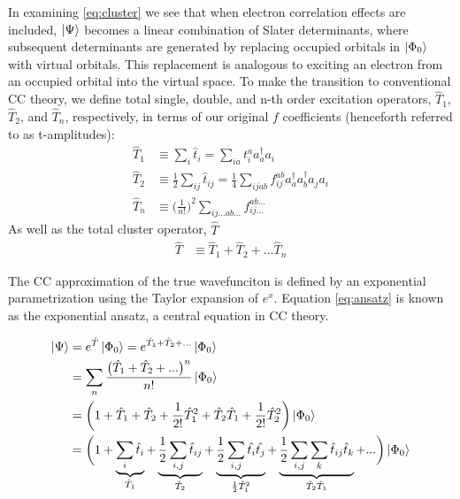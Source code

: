 \documentclass[letterpaper, 12pt]{article}
\newcommand{\adag}{a^{\dagger}} %
\begin{document}
In examining \eqref{eq:cluster} we see that when electron correlation effects are included, $\ket{\Psi}$ becomes a linear combination of Slater determinants, where subsequent determinants are generated by replacing occupied orbitals in $\ket{\Phi_{0}}$ with virtual orbitals. This replacement is analogous to exciting an electron from an occupied orbital into the virtual space. To make the transition to conventional CC theory, we define total single, double, and n-th order excitation operators, $\hat{T}_1$, $\hat{T}_2$, and $\hat{T}_n$, respectively, in terms of our original $f$ coefficients (henceforth referred to as t-amplitudes): \begin{align}
\hat{T}_1 &\equiv \sum_{i}  \hat{t}_i = \sum_{ia}  t^a_i \adag_a a_i\\
\hat{T}_2 &\equiv \frac{1}{2} \sum_{ij}  \hat{t}_{ij}  = \frac{1}{4}\sum_{ijab}  f^{ab}_{ij}\adag_a \adag_b a_j a_i \\
\hat{T}_n &\equiv \bigg(\frac{1}{n!}\bigg)^2 \sum_{ij\dots ab\dots} f^{ab\dots}_{ij\dots} 
\end{align}
As well as the total cluster operator, $\hat{T}$
\begin{align}
\hat{T} &\equiv \hat{T}_1 + \hat{T}_2 + \dots \hat{T}_n
\end{align}

The CC approximation of the true wavefunciton is defined by an exponential parametrization using the Taylor expansion of $e^x$. Equation \eqref{eq:ansatz} is known as the exponential ansatz, a central equation in CC theory.

\begin{align}
\ket{\Psi} \label{eq:ansatz}&= e^{\hat{T}} \ket{\Phi_{0}} =e^{\hat{T}_1 + \hat{T}_2 + ... }  \ket{\Phi_{0}}\\ 
&= \sum_n \frac{\big(\hat{T}_1 + \hat{T}_2 + ...  \big)^n}{n!} \ket{\Phi_{0}}\\
 &=  \bigg(1 + \hat{T}_1 + \hat{T}_2 + \frac{1}{2!} \hat{T}^2_1 +  \hat{T}_2\hat{T}_1 + \frac{1}{2!}\hat{T}^2_2 \bigg)\ket{\Phi_{0}}\\
&= \bigg(1 +
\underbrace{\sum_{i} \hat{t}_i}_{\hat{T}_1} +
\underbrace{\frac{1}{2} \sum_{i,j} \hat{t}_{ij}}_{\hat{T}_2} +
\underbrace{\frac{1}{2} \sum_{i,j} \hat{t_i} \hat{t_j}}_{\frac{1}{2}\hat{T}^2_1}  + 
\underbrace{\frac{1}{2} \sum_{i,j}\sum_{k} \hat{t}_{ij}\hat{t}_{k}}_{\hat{T}_2 \hat{T}_1} + ... \bigg) \ket{\Phi_{0}} \label{eq:ansatzExpansion}
\end{align} 
\end{document}

